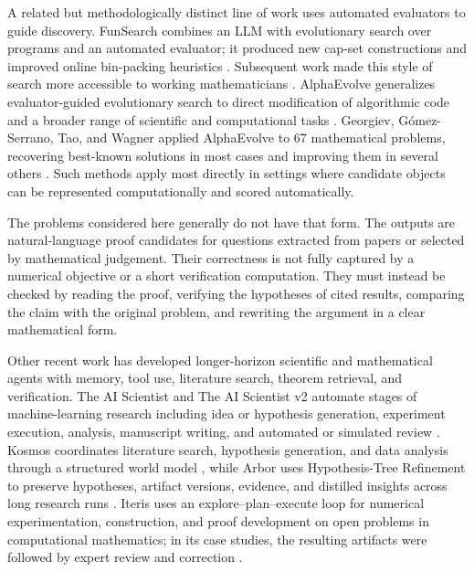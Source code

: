 \documentclass[11pt,reqno]{amsart}
\theoremstyle{plain}
\theoremstyle{definition}
\begin{document}
A related but methodologically distinct line of work uses automated evaluators to guide discovery. FunSearch combines an LLM with evolutionary search over programs and an automated evaluator; it produced new cap-set constructions and improved online bin-packing heuristics \cite{RomeraParedesEtAl2024FunSearch}. Subsequent work made this style of search more accessible to working mathematicians \cite{EllenbergEtAl2025GenerativeModelling}. AlphaEvolve generalizes evaluator-guided evolutionary search to direct modification of algorithmic code and a broader range of scientific and computational tasks \cite{NovikovEtAl2025AlphaEvolve}. Georgiev, G\'omez-Serrano, Tao, and Wagner applied AlphaEvolve to 67 mathematical problems, recovering best-known solutions in most cases and improving them in several others \cite{GeorgievEtAl2025MathDiscoveryScale}. Such methods apply most directly in settings where candidate objects can be represented computationally and scored automatically.

The problems considered here generally do not have that form. The outputs are natural-language proof candidates for questions extracted from papers or selected by mathematical judgement. Their correctness is not fully captured by a numerical objective or a short verification computation. They must instead be checked by reading the proof, verifying the hypotheses of cited results, comparing the claim with the original problem, and rewriting the argument in a clear mathematical form.

Other recent work has developed longer-horizon scientific and mathematical agents with memory, tool use, literature search, theorem retrieval, and verification. The AI Scientist and The AI Scientist v2 automate stages of machine-learning research including idea or hypothesis generation, experiment execution, analysis, manuscript writing, and automated or simulated review \cite{LuEtAl2024AIScientist,YamadaEtAl2025AIScientistV2}. Kosmos coordinates literature search, hypothesis generation, and data analysis through a structured world model \cite{MitchenerEtAl2025Kosmos}, while Arbor uses Hypothesis-Tree Refinement to preserve hypotheses, artifact versions, evidence, and distilled insights across long research runs \cite{JinEtAl2026Arbor}. Iteris uses an explore--plan--execute loop for numerical experimentation, construction, and proof development on open problems in computational mathematics; in its case studies, the resulting artifacts were followed by expert review and correction \cite{ChenLiuHeDong2026Iteris}.
\end{document}

